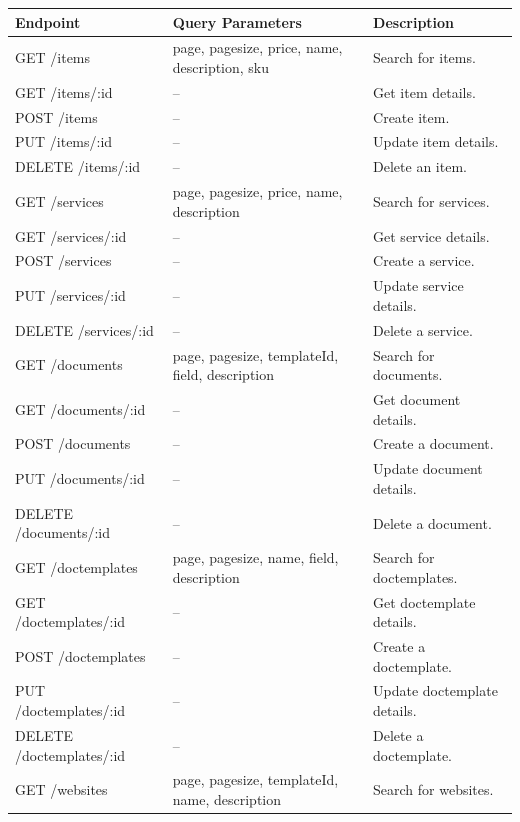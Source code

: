 \documentclass{article}
\begin{document}
\begin{table}[H]
    \centering
    \begin{tabular}{|l|p{4.5cm}|l|}\hline
        Endpoint & Query Parameters & Description\\\hline\hline
         GET /items & page, pagesize, price, name, description, sku & Search for items. \\\hline
         GET /items/:id & -- & Get item details. \\\hline
         POST /items & -- & Create item. \\\hline
         PUT /items/:id & -- & Update item details. \\\hline
         DELETE /items/:id & -- & Delete an item. \\\hline
         GET /services & page, pagesize, price, name, description & Search for services. \\\hline
         GET /services/:id & -- & Get service details. \\\hline
         POST /services & -- & Create a service. \\\hline
         PUT /services/:id & -- & Update service details. \\\hline
         DELETE /services/:id & -- & Delete a service. \\\hline
         GET /documents & page, pagesize, templateId, field, description & Search for documents. \\\hline
         GET /documents/:id & -- & Get document details. \\\hline
         POST /documents & -- & Create a document. \\\hline
         PUT /documents/:id & -- & Update document details. \\\hline
         DELETE /documents/:id & -- & Delete a document. \\\hline
         GET /doctemplates & page, pagesize, name, field, description & Search for doctemplates. \\\hline
         GET /doctemplates/:id & -- & Get doctemplate details. \\\hline
         POST /doctemplates & -- & Create a doctemplate. \\\hline
         PUT /doctemplates/:id & -- & Update doctemplate details. \\\hline
         DELETE /doctemplates/:id & -- & Delete a doctemplate. \\\hline
         GET /websites & page, pagesize, templateId, name, description & Search for websites. \\\hline

\end{tabular}
\end{table}
\end{document}
